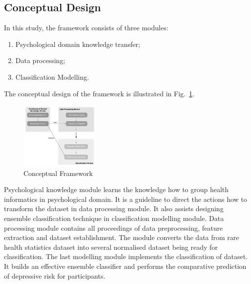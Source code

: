 \documentclass[10pt,journal,compsoc]{IEEEtran}
\begin{document}
\subsection{Conceptual Design}
In this study, the framework consists of three modules:
\begin{enumerate}
  \item Psychological domain knowledge transfer;
  \item Data processing;
  \item Classification Modelling.
\end{enumerate}
The conceptual design of the framework is illustrated in Fig.~\ref{fig1}.
\begin{figure}[h]
\centering
\captionsetup{justification=centering}
\includegraphics[width=0.35\textwidth]{concepts.png}
\caption{Conceptual Framework} \label{fig1}
\end{figure}
%
Psychological knowledge module learns the knowledge how to group health informatics in psychological domain. It is a guideline to direct the actions how to transform the dataset in data processing module. It also assists designing ensemble classification technique in classification modelling module. Data processing module contains all proceedings of data preprocessing, feature extraction and dataset establishment. The module converts the data from rare health statistics dataset into several normalised dataset being ready for classification. The last modelling module implements the classification of dataset. It builds an effective ensemble classifier and performs the comparative prediction of depressive risk for participants. 
%
%
%
\end{document}
